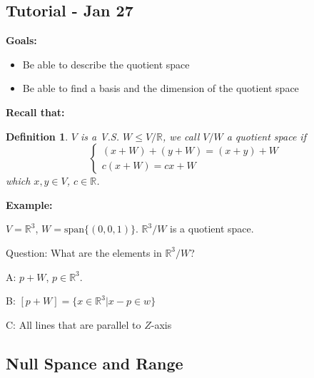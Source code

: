 \documentclass[12pt]{article}
\newtheorem{definition}{Definition}[subsection]
\newcommand{\Span}{\mathrm{span}}
\newcommand{\mR}{{\mathbb{R}}}
\begin{document}


	\newpage
	\subsection{Tutorial - Jan 27}
	
	\textbf{Goals: }
	\begin{itemize}
		\item Be able to describe the quotient space
		\item Be able to find a basis and the dimension of the quotient space
	\end{itemize}

	\textbf{Recall that: }
	
	\begin{definition}
		$V$ is a V.S. $W\leq V / \mR$, we call $V/W$ a quotient space if 
		\[
			\begin{cases}
				(x+W)+(y+W) = (x+y)+W\\
				c(x+W) = cx+W 
			\end{cases}
		\]
		which $x, y \in V$, $c \in \mR$.
	\end{definition}

	{\color{Brown}
		\textbf{Example: }
		
		$V = \mR^3$, $W = \Span\{(0,0,1)\}$. $\mR^3 / W$ is a quotient space.

		Question: What are the elements in $\mR^3/W$?
		
		A: $p+W$, $p \in \mR^3$.

		B: $[p+W]= \{x\in \mR^3 | x-p \in w\}$
		
		C: All lines that are parallel to $Z$-axis
	}
	


	\newpage
	\subsection{Null Spance and Range}
\end{document}
